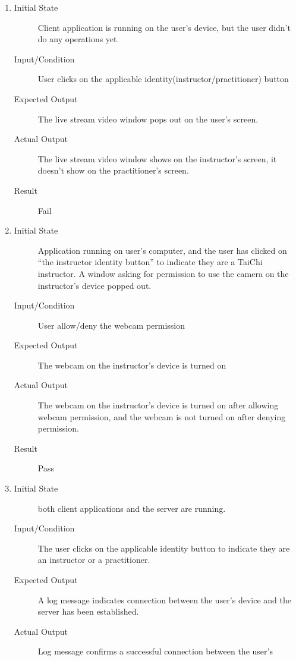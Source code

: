 \documentclass[12pt, titlepage]{article}
\begin{document}
\begin{enumerate}[FR-T1]
  \item \label{FRT1}
    \begin{description}
    \item[Initial State] Client application is running on the user's device, but the
      user didn’t do any operations yet.
    \item[Input/Condition] User clicks on the applicable
      identity(instructor/practitioner) button
    \item[Expected Output] The live stream video window pops out on the user's screen.
    \item[Actual Output] The live stream video window shows on the instructor's screen, 
    it doesn't show on the practitioner's screen.
    \item[Result] Fail
    \end{description}
  \item \label{FRT2}
    \begin{description}
    \item[Initial State] Application running on user’s computer, and the user has
      clicked on “the instructor identity button” to indicate they are a TaiChi
      instructor. A window asking for permission to use the camera on the
      instructor's device popped out.
    \item[Input/Condition] User allow/deny the webcam permission
    \item[Expected Output] The webcam on the instructor’s device is turned on
    \item[Actual Output] The webcam on the instructor’s device is turned on after 
    allowing webcam permission, and the webcam is not turned on after denying permission.
    \item[Result] Pass
    \end{description}
  \item \label{FRT3}
    \begin{description}
    \item[Initial State] both client applications and the server are running.
    \item[Input/Condition] The user clicks on the applicable identity button to
      indicate they are an instructor or a practitioner.
    \item[Expected Output] A log message indicates connection between the user’s device
      and the server has been established.
    \item[Actual Output] Log message confirms a successful connection between the user’s 

\end{description}
\end{enumerate}
\end{document}

